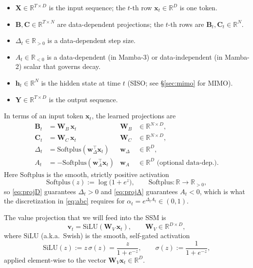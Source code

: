 \documentclass[11pt,a4paper]{article}
\begin{document}
\begin{itemize}
  \item $\bm{X} \in \mathbb{R}^{T\times D}$ is the input sequence;
        the $t$-th row $\bm{x}_t \in \mathbb{R}^{D}$ is one token.
  \item $\bm{B}, \bm{C} \in \mathbb{R}^{T\times N}$ are data-dependent
        projections; the $t$-th rows are $\bm{B}_t, \bm{C}_t \in
        \mathbb{R}^{N}$.
  \item $\Delta_t \in \mathbb{R}_{>0}$ is a data-dependent step size.
  \item $A_t \in \mathbb{R}_{<0}$ is a data-dependent (in Mamba-3) or
        data-independent (in Mamba-2) scalar that governs decay.
  \item $\bm{h}_t \in \mathbb{R}^{N}$ is the hidden state at time $t$
        (SISO; see \S\ref{sec:mimo} for MIMO).
  \item $\bm{Y} \in \mathbb{R}^{T\times D}$ is the output sequence.
\end{itemize}

In terms of an input token $\bm{x}_t$, the learned projections are
\begin{align}
  \bm{B}_t       &= \bm{W}_B\,\bm{x}_t  & \bm{W}_B &\in \mathbb{R}^{N\times D}, \label{eq:projB}\\
  \bm{C}_t       &= \bm{W}_C\,\bm{x}_t  & \bm{W}_C &\in \mathbb{R}^{N\times D}, \label{eq:projC}\\
  \Delta_t       &= \mathrm{Softplus}(\bm{w}_\Delta^\top \bm{x}_t)
                                         & \bm{w}_\Delta &\in \mathbb{R}^{D}, \label{eq:projD}\\
  A_t            &= -\mathrm{Softplus}(\bm{w}_A^\top \bm{x}_t)
                                         & \bm{w}_A &\in \mathbb{R}^{D} \text{ (optional data-dep.)}. \label{eq:projA}
\end{align}
Here $\mathrm{Softplus}$ is the smooth, strictly positive activation
\begin{equation}\label{eq:softplus}
  \mathrm{Softplus}(z) := \log\bigl(1 + e^{z}\bigr),
  \qquad \mathrm{Softplus}:\mathbb{R}\to\mathbb{R}_{>0},
\end{equation}
so \eqref{eq:projD} guarantees $\Delta_t > 0$ and \eqref{eq:projA}
guarantees $A_t < 0$, which is what the discretization in
\eqref{eq:abc} requires for $\alpha_t = e^{\Delta_t A_t} \in (0,1)$.

The value projection that we will feed into the SSM is
\begin{equation}\label{eq:projV}
  \bm{v}_t = \mathrm{SiLU}(\bm{W}_V\,\bm{x}_t),
  \qquad \bm{W}_V \in \mathbb{R}^{D\times D},
\end{equation}
where $\mathrm{SiLU}$ (a.k.a.\ Swish) is the smooth, self-gated activation
\begin{equation}\label{eq:silu}
  \mathrm{SiLU}(z) := z\,\sigma(z) = \frac{z}{1 + e^{-z}},
  \qquad
  \sigma(z) := \frac{1}{1 + e^{-z}},
\end{equation}
applied element-wise to the vector $\bm{W}_V\bm{x}_t \in \mathbb{R}^{D}$.
\end{document}
